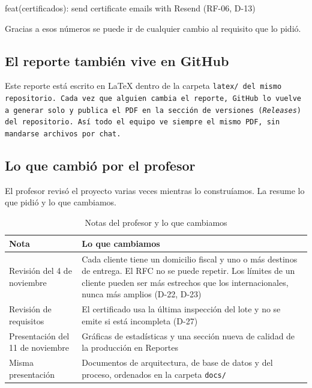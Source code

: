\begin{codigo}
feat(certificados): send certificate emails with Resend (RF-06, D-13)
\end{codigo}

Gracias a esos números se puede ir de cualquier cambio al requisito que lo pidió.

\subsection{El reporte también vive en GitHub}\label{sec:reporte-ci}

Este reporte está escrito en LaTeX dentro de la carpeta \tt{latex/} del mismo repositorio. Cada vez que alguien cambia el reporte, GitHub lo vuelve a generar solo y publica el PDF en la sección de versiones (\textit{Releases}) del repositorio. Así todo el equipo ve siempre el mismo PDF, sin mandarse archivos por chat.

\subsection{Lo que cambió por el profesor}\label{sec:profesor}

El profesor revisó el proyecto varias veces mientras lo construíamos. La  resume lo que pidió y lo que cambiamos.

\begin{table}[H]
  \centering
  \caption{Notas del profesor y lo que cambiamos}\label{tab:profesor}
  \begin{tabularx}{\linewidth}{@{}p{3.2cm}X@{}}
    \toprule
    Nota & Lo que cambiamos \\
    \midrule
    Revisión del 4 de noviembre & Cada cliente tiene un domicilio fiscal y uno o más destinos de entrega. El RFC no se puede repetir. Los límites de un cliente pueden ser más estrechos que los internacionales, nunca más amplios (D-22, D-23) \\
    Revisión de requisitos & El certificado usa la última inspección del lote y no se emite si está incompleta (D-27) \\
    Presentación del 11 de noviembre & Gráficas de estadísticas y una sección nueva de calidad de la producción en Reportes \\
    Misma presentación & Documentos de arquitectura, de base de datos y del proceso, ordenados en la carpeta \tt{docs/} \\
    \bottomrule
  \end{tabularx}
\end{table}
